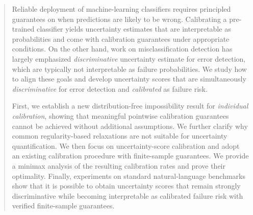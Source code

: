 \documentclass{article}
\theoremstyle{plain}
\theoremstyle{definition}
\theoremstyle{remark}
\begin{document}

\printAffiliationsAndNotice{}  %

\begin{abstract}
Reliable deployment of machine-learning classifiers requires principled guarantees on when predictions are likely to be wrong. Calibrating a pre-trained classifier yields uncertainty estimates that are interpretable as probabilities and come with calibration guarantees under appropriate conditions. On the other hand, work on misclassification detection has largely emphasized \emph{discriminative} uncertainty estimate for error detection, which are typically not interpretable as failure probabilities. We study how to align these goals and develop uncertainty scores that are simultaneously \emph{discriminative} for error detection and \emph{calibrated} as failure risk.

First, we establish a new distribution-free impossibility result for \textit{individual calibration}, showing that meaningful pointwise calibration guarantees cannot be achieved without additional assumptions. We further clarify why common regularity-based relaxations are not suitable for uncertainty quantification. We then focus on uncertainty-score calibration and adopt an existing calibration procedure with finite-sample guarantees. We provide a minimax analysis of the resulting calibration rates and prove their optimality. Finally, experiments on standard natural-language benchmarks show that it is possible to obtain uncertainty scores that remain strongly discriminative while becoming interpretable as calibrated failure risk with verified finite-sample guarantees.
\end{abstract}
\end{document}
